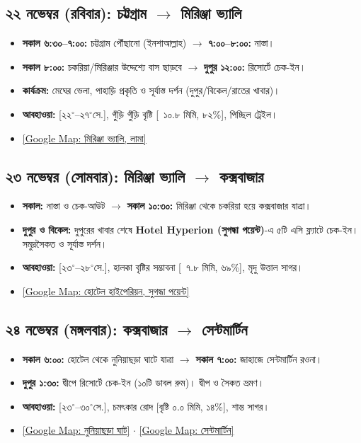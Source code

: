 \documentclass[11pt]{article}
\begin{document}
\subsection*{২২ নভেম্বর (রবিবার): চট্টগ্রাম $\rightarrow$ মিরিঞ্জা ভ্যালি}
\begin{itemize}
    \item \textbf{সকাল ৬:৩০--৭:০০:} চট্টগ্রাম পৌঁছানো (ইনশাআল্লাহ) $\rightarrow$ \textbf{৭:০০--৮:০০:} নাস্তা।
    \item \textbf{সকাল ৮:০০:} চকরিয়া/মিরিঞ্জার উদ্দেশ্যে বাস ছাড়বে $\rightarrow$ \textbf{দুপুর ১২:০০:} রিসোর্টে চেক-ইন।
    \item \textbf{কার্যক্রম:} মেঘের ভেলা, পাহাড়ি প্রকৃতি ও সূর্যাস্ত দর্শন (দুপুর/বিকেল/রাতের খাবার)।
    \item \textbf{আবহাওয়া:} [২২$^\circ$--২৭$^\circ$সে.], গুঁড়ি গুঁড়ি বৃষ্টি [~১০.৮ মিমি, ৮২\%], পিচ্ছিল ট্রেইল।
    \item \href{https://maps.google.com/?q=Mirinja+Valley+Lama+Bandarban}{\color{primary}[Google Map: মিরিঞ্জা ভ্যালি, লামা]}
\end{itemize}

\subsection*{২৩ নভেম্বর (সোমবার): মিরিঞ্জা ভ্যালি $\rightarrow$ কক্সবাজার}
\begin{itemize}
    \item \textbf{সকাল:} নাস্তা ও চেক-আউট $\rightarrow$ \textbf{সকাল ১০:৩০:} মিরিঞ্জা থেকে চকরিয়া হয়ে কক্সবাজার যাত্রা।
    \item \textbf{দুপুর ও বিকেল:} দুপুরের খাবার শেষে \textbf{Hotel Hyperion (সুগন্ধা পয়েন্ট)}-এ ৫টি এসি ফ্ল্যাটে চেক-ইন। সমুদ্রসৈকত ও সূর্যাস্ত দর্শন।
    \item \textbf{আবহাওয়া:} [২৩$^\circ$--২৮$^\circ$সে.], হালকা বৃষ্টির সম্ভাবনা [~৭.৮ মিমি, ৬৯\%], মৃদু উত্তাল সাগর।
    \item \href{https://maps.google.com/?q=Hotel+Hyperion+Sugandha+Point+Coxs+Bazar}{\color{primary}[Google Map: হোটেল হাইপেরিয়ন, সুগন্ধা পয়েন্ট]}
\end{itemize}

\newpage

\subsection*{২৪ নভেম্বর (মঙ্গলবার): কক্সবাজার $\rightarrow$ সেন্টমার্টিন}
\begin{itemize}
    \item \textbf{সকাল ৬:০০:} হোটেল থেকে নুনিয়াছড়া ঘাটে যাত্রা $\rightarrow$ \textbf{সকাল ৭:০০:} জাহাজে সেন্টমার্টিন রওনা।
    \item \textbf{দুপুর ১:৩০:} দ্বীপে রিসোর্টে চেক-ইন (১০টি ডাবল রুম)। দ্বীপ ও সৈকত ভ্রমণ।
    \item \textbf{আবহাওয়া:} [২৩$^\circ$--৩০$^\circ$সে.], চমৎকার রোদ [বৃষ্টি ০.০ মিমি, ১৪\%], শান্ত সাগর।
    \item \href{https://maps.google.com/?q=BIWTA+Ghat+Nuniachhara+Coxs+Bazar}{\color{primary}[Google Map: নুনিয়াছড়া ঘাট]} $\cdot$ \href{https://maps.google.com/?q=Saint+Martin+Island+Bangladesh}{\color{primary}[Google Map: সেন্টমার্টিন]}
\end{itemize}
\end{document}
